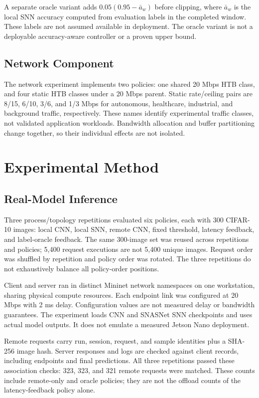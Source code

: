 \documentclass[journal]{IEEEtran}
\begin{document}
A separate oracle variant adds $0.05(0.95-\bar a_w)$ before clipping, where $\bar a_w$ is the local SNN accuracy computed from evaluation labels in the completed window. These labels are not assumed available in deployment. The oracle variant is not a deployable accuracy-aware controller or a proven upper bound.

\subsection{Network Component}
The network experiment implements two policies: one shared 20 Mbps HTB class, and four static HTB classes under a 20 Mbps parent. Static rate/ceiling pairs are 8/15, 6/10, 3/6, and 1/3 Mbps for autonomous, healthcare, industrial, and background traffic, respectively. These names identify experimental traffic classes, not validated application workloads. Bandwidth allocation and buffer partitioning change together, so their individual effects are not isolated.

\section{Experimental Method}
\label{sec:setup}
\subsection{Real-Model Inference}
Three process/topology repetitions evaluated six policies, each with 300 CIFAR-10 images: local CNN, local SNN, remote CNN, fixed threshold, latency feedback, and label-oracle feedback. The same 300-image set was reused across repetitions and policies; 5,400 request executions are not 5,400 unique images. Request order was shuffled by repetition and policy order was rotated. The three repetitions do not exhaustively balance all policy-order positions.

Client and server ran in distinct Mininet network namespaces on one workstation, sharing physical compute resources. Each endpoint link was configured at 20 Mbps with 2 ms delay. Configuration values are not measured delay or bandwidth guarantees. The experiment loads CNN and SNASNet SNN checkpoints and uses actual model outputs. It does not emulate a measured Jetson Nano deployment.

Remote requests carry run, session, request, and sample identities plus a SHA-256 image hash. Server responses and logs are checked against client records, including endpoints and final predictions. All three repetitions passed these association checks: 323, 323, and 321 remote requests were matched. These counts include remote-only and oracle policies; they are not the offload counts of the latency-feedback policy alone.
\end{document}

